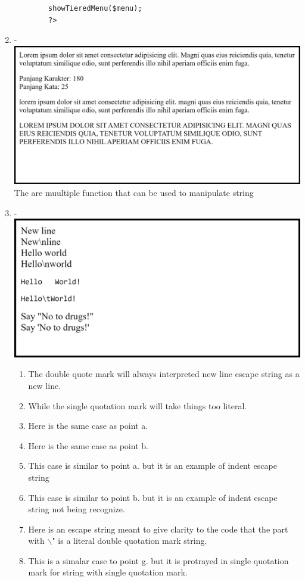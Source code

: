\documentclass[12pt,titlepage]{article}
\begin{document}
\begin{enumerate}
\begin{verbatim}
        showTieredMenu($menu);
        ?>
    \end{verbatim}
    
    \newpage

    \item - \\ \includegraphics[width=.85\textwidth]{images/figures/fig13.png} \\ The are muultiple function that can be used to manipulate string
    \item - \\ \includegraphics[width=.85\textwidth]{images/figures/fig14.png}
    \begin{enumerate}[label=\alph*.]
        \item The double quote mark will always interpreted new line escape string as a new line.
        \item While the single quotation mark will take things too literal.
        \item Here is the same case as point a.
        \item Here is the same case as point b.
        \item This case is similar to point a. but it is an example of indent escape string
        \item This case is similar to point b. but it is an example of indent escape string not being recognize.
        \item Here is an escape string meant to give clarity to the code that the part with $\backslash$" is a literal double quotation mark string.
        \item This is a simalar case to point g. but it is protrayed in single quotation mark for string with single quotation mark.
    \end{enumerate}
    

\end{enumerate}
\end{document}
